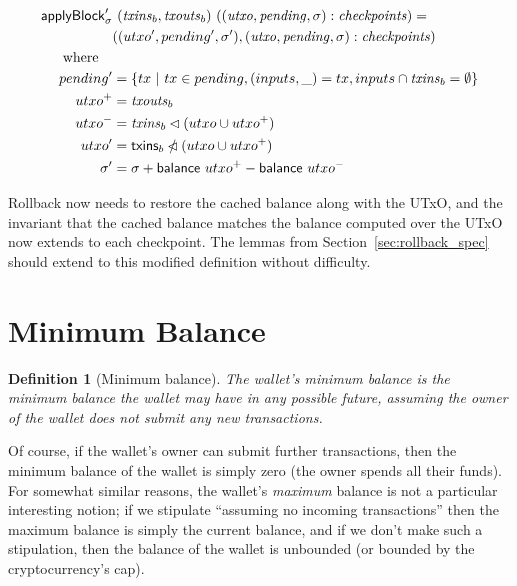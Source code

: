 \documentclass{article}
\newcommand{\restrictdom}{\lhd}
\newcommand{\subtractdom}{\mathbin{\slashed{\restrictdom}}}
\newtheorem{definition}{Definition}
\begin{document}
\begin{equation*}
\begin{split}
\mathsf{applyBlock}'_\sigma & ~ (\mathit{txins}_b, \mathit{txouts}_b) ~ ((\mathit{utxo}, \mathit{pending}, \sigma) : \mathit{checkpoints}) = \\
& ((utxo^\prime, pending^\prime, \sigma^\prime), (\mathit{utxo}, \mathit{pending}, \sigma) : \mathit{checkpoints}) \\
\text{where} \quad \\
    pending^\prime & = \{ tx ~|~ tx \in pending, (inputs, \_) = tx, inputs \cap \mathit{txins}_b = \emptyset \} \\
    utxo^+ & = \mathit{txouts}_b \\
    utxo^- & = \mathit{txins}_b \restrictdom (utxo \cup utxo^+) \\
    utxo^\prime & = \mathsf{txins}_b \subtractdom (utxo \cup utxo^+) \\
    \sigma^\prime & = \sigma + \mathsf{balance} ~ utxo^+ - \mathsf{balance} ~ utxo^- \\
\end{split}
\end{equation*}

Rollback now needs to restore the cached balance along with the UTxO, and the
invariant that the cached balance matches the balance computed over the UTxO
now extends to each checkpoint. The lemmas from Section~\ref{sec:rollback_spec}
should extend to this modified definition without difficulty.

\section{Minimum Balance}


\begin{definition}[Minimum balance]
The wallet's \emph{minimum balance} is the minimum balance the wallet may have
in any possible future, assuming the owner of the wallet does not submit any
new transactions.
\end{definition}



Of course, if the wallet's owner can submit further transactions, then the
minimum balance of the wallet is simply zero (the owner spends all their
funds). For somewhat similar reasons, the wallet's \emph{maximum} balance
is not a particular interesting notion; if we stipulate ``assuming no
incoming transactions'' then the maximum balance is simply the current balance,
and if we don't make such a stipulation, then the balance of the wallet is
unbounded (or bounded by the cryptocurrency's cap).
\end{document}
